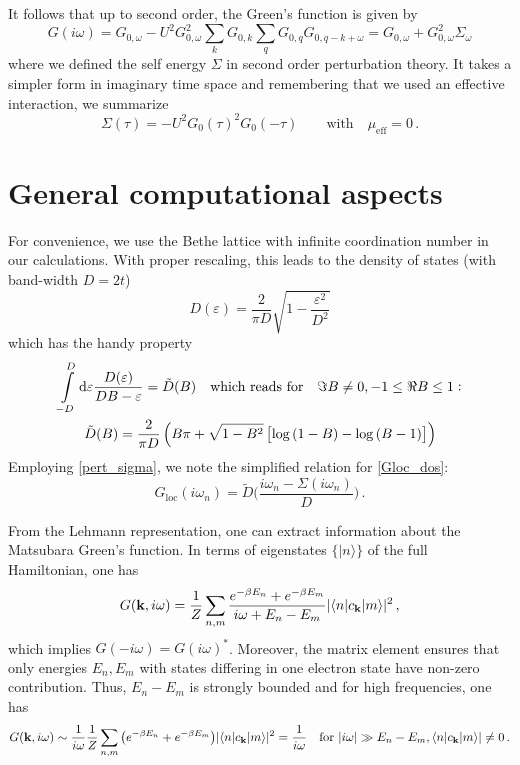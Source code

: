 \documentclass[11pt]{article}
\begin{document}
It follows that up to second order, the Green's function is given by
%
\begin{equation*}
G(i\omega) = G_{0, \omega} - U^2 G_{0,\omega}^2 
	\sum_k G_{0,k} \sum_{q} G_{0,q}G_{0,q-k+\omega}
	= G_{0, \omega} + G_{0,\omega}^2 \Sigma_{\omega}
\end{equation*}
%
where we defined the self energy $\Sigma$ in second order perturbation theory. It takes a simpler form in imaginary time space and remembering that we used an effective interaction, we summarize 
%
\begin{equation}
\label{pert_sigma}
\Sigma(\tau) = - U^2 G_0(\tau)^2 G_0(-\tau)
\quad \quad
\text{with}
\quad 
\mu_{\text{eff}} = 0
\, .
\end{equation}


\section{General computational aspects}

For convenience, we use the Bethe lattice with infinite coordination number in our calculations. With proper rescaling, this leads to the density of states (with band-width $D=2t$)
%
\begin{equation}
D(\varepsilon) = \frac{2}{\pi D} \sqrt{ 1-\frac{\varepsilon^2}{D^2} }
\end{equation}
%
which has the handy property
\begin{gather}
\int\limits_{-D}^{D} \dif \varepsilon 
\frac{D(\varepsilon)}{DB-\varepsilon} = \tilde{D}(B) 
\quad \text{which reads for} \quad
\Im{B} \neq 0,  -1\leq\Re{B}\leq 1 :
\\
\tilde{D}(B) = \frac{2}{\pi D} \left( B \pi + \sqrt{1-B^2}\left[\log{(1-B)}-\log{(B-1)}\right] \right)
\end{gather}
%
Employing \eqref{pert_sigma}, we note the simplified relation for \eqref{Gloc_dos}:
%
\begin{equation}
G_{\text{loc}} (i\omega_n) = \tilde{D} \Big( \frac{i\omega_n-\Sigma(i\omega_n)}{D} \Big)
\, .
\end{equation}

From the Lehmann representation, one can extract information about the Matsubara Green's function. In terms of eigenstates $\{ | n \rangle \}$ of the full Hamiltonian, one has
%
\begin{equation}
G(\bold{k},i\omega) = \frac{1}{Z} \sum_{n,m} \frac{ e^{-\beta E_n} + e^{-\beta E_m} }{i\omega + E_n - E_m} 
	| \langle n | c_{\bold{k}} | m \rangle |^2
\, ,
\end{equation}
%
which implies $G(-i\omega) = G(i\omega)^*$. Moreover, the matrix element ensures that only energies $E_n, E_m$ with states differing in one electron state have non-zero contribution. Thus, $E_n - E_m$ is strongly bounded and for high frequencies, one has
%
\begin{equation}
\label{G_largefreq}
G(\bold{k},i\omega) \sim \frac{1}{i\omega} \frac{1}{Z} \sum_{n,m} \big( e^{-\beta E_n} + e^{-\beta E_m} \big)
	| \langle n | c_{\bold{k}} | m \rangle |^2
	= \frac{1}{i\omega}
\quad \text{for }
| i\omega | \gg E_n - E_m, \langle n | c_{\bold{k}} | m \rangle | \neq 0
\, .
\end{equation}
\end{document}
